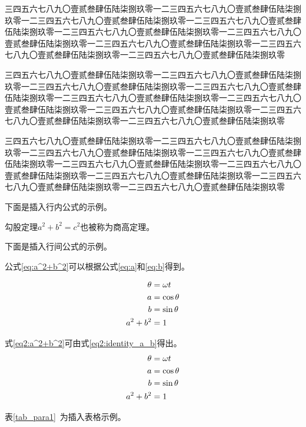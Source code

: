 \documentclass[master,academic]{ysuthesis} %
\begin{document}
		三四五六七八九〇壹贰叁肆伍陆柒捌玖零一二三四五六七八九〇壹贰叁肆伍陆柒捌玖零一二三四五六七八九〇壹贰叁肆伍陆柒捌玖零一二三四五六七八九〇壹贰叁肆伍陆柒捌玖零一二三四五六七八九〇壹贰叁肆伍陆柒捌玖零一二三四五六七八九〇壹贰叁肆伍陆柒捌玖零一二三四五六七八九〇壹贰叁肆伍陆柒捌玖零一二三四五六七八九〇壹贰叁肆伍陆柒捌玖零一二三四五六七八九〇壹贰叁肆伍陆柒捌玖零
		
		三四五六七八九〇壹贰叁肆伍陆柒捌玖零一二三四五六七八九〇壹贰叁肆伍陆柒捌玖零一二三四五六七八九〇壹贰叁肆伍陆柒捌玖零一二三四五六七八九〇壹贰叁肆伍陆柒捌玖零一二三四五六七八九〇壹贰叁肆伍陆柒捌玖零一二三四五六七八九〇壹贰叁肆伍陆柒捌玖零一二三四五六七八九〇壹贰叁肆伍陆柒捌玖零一二三四五六七八九〇壹贰叁肆伍陆柒捌玖零一二三四五六七八九〇壹贰叁肆伍陆柒捌玖零
		
		三四五六七八九〇壹贰叁肆伍陆柒捌玖零一二三四五六七八九〇壹贰叁肆伍陆柒捌玖零一二三四五六七八九〇壹贰叁肆伍陆柒捌玖零一二三四五六七八九〇壹贰叁肆伍陆柒捌玖零一二三四五六七八九〇壹贰叁肆伍陆柒捌玖零一二三四五六七八九〇壹贰叁肆伍陆柒捌玖零一二三四五六七八九〇壹贰叁肆伍陆柒捌玖零一二三四五六七八九〇壹贰叁肆伍陆柒捌玖零一二三四五六七八九〇壹贰叁肆伍陆柒捌玖零

		下面是插入行内公式的示例。

		勾股定理$a^2+b^2=c^2$也被称为商高定理。

		下面是插入行间公式的示例。

		公式\eqref{eq:a^2+b^2}可以根据公式\eqref{eq:a}和\eqref{eq:b}得到。

		\begin{align}
			\theta&=\omega t\notag\\
			a&=\cos\theta \label{eq:a}\\
			b&=\sin\theta \label{eq:b}\\
			a^2+b^2&=1
			\label{eq:a^2+b^2}
		\end{align}

		式\eqref{eq2:a^2+b^2}可由式\eqref{eq2:identity_a_b}得出。
		\begin{subequations}
			\label{eq2:identity_a_b}
			\begin{align}
				\theta&=\omega t\notag\\
				a&=\cos\theta \label{eq2:a}\\
				b&=\sin\theta \label{eq2:b}\\
				a^2+b^2&=1
				\label{eq2:a^2+b^2}
			\end{align}
		\end{subequations}

		表\ref{tab_para1}~为插入表格示例。
\end{document}
